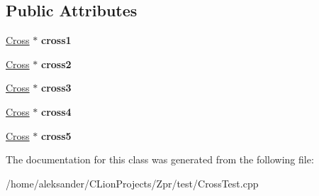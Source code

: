 \subsection*{Public Attributes}
\begin{DoxyCompactItemize}
\item 
\hypertarget{classCrossTest_af2f3d52c7440ac3e6223c75e125182ad}{\hyperlink{classCross}{Cross} $\ast$ {\bfseries cross1}}\label{classCrossTest_af2f3d52c7440ac3e6223c75e125182ad}

\item 
\hypertarget{classCrossTest_a2c4c65790a9116cfa2ead593caee515a}{\hyperlink{classCross}{Cross} $\ast$ {\bfseries cross2}}\label{classCrossTest_a2c4c65790a9116cfa2ead593caee515a}

\item 
\hypertarget{classCrossTest_ae43298a5b19936b1fad6d50664ec2eac}{\hyperlink{classCross}{Cross} $\ast$ {\bfseries cross3}}\label{classCrossTest_ae43298a5b19936b1fad6d50664ec2eac}

\item 
\hypertarget{classCrossTest_a4b61562083e4c5e44c21f49b2b62ba65}{\hyperlink{classCross}{Cross} $\ast$ {\bfseries cross4}}\label{classCrossTest_a4b61562083e4c5e44c21f49b2b62ba65}

\item 
\hypertarget{classCrossTest_aee9ea5edcf55f7f8b1fde08f40db3b17}{\hyperlink{classCross}{Cross} $\ast$ {\bfseries cross5}}\label{classCrossTest_aee9ea5edcf55f7f8b1fde08f40db3b17}

\end{DoxyCompactItemize}


The documentation for this class was generated from the following file\-:\begin{DoxyCompactItemize}
\item 
/home/aleksander/\-C\-Lion\-Projects/\-Zpr/test/Cross\-Test.\-cpp\end{DoxyCompactItemize}
